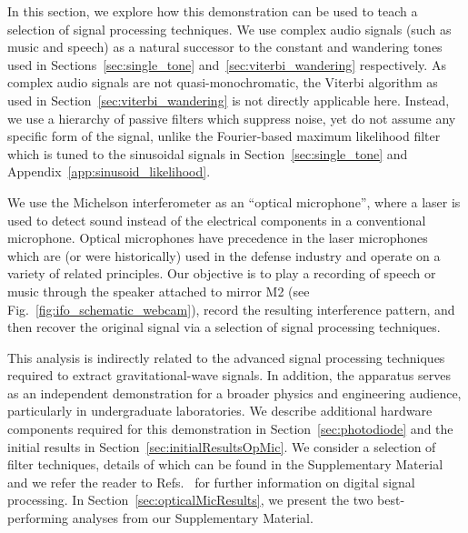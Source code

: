 \documentclass[paper-main.tex]{subfiles}
\begin{document}
In this section, we explore how this demonstration can be used to teach a selection of signal processing techniques. 
We use complex audio signals (such as music and speech) as a natural successor to the constant and wandering tones used in Sections~\ref{sec:single_tone} and~\ref{sec:viterbi_wandering} respectively.
As complex audio signals are not quasi-monochromatic, the Viterbi algorithm as used in Section~\ref{sec:viterbi_wandering} is not directly applicable here. 
Instead, we use a hierarchy of passive filters which suppress noise, yet do not assume any specific form of the signal, unlike the Fourier-based maximum likelihood filter which is tuned to the sinusoidal signals in Section~\ref{sec:single_tone} and Appendix~\ref{app:sinusoid_likelihood}.

We use the Michelson interferometer as an ``optical microphone'', where a laser is used to detect sound instead of the electrical components in a conventional microphone.
Optical microphones have precedence in the laser microphones~\cite{laser_microphone} which are (or were historically) used in the defense industry and operate on a variety of related principles. 
Our objective is to play a recording of speech or music through the speaker attached to mirror M2 (see Fig.~\ref{fig:ifo_schematic_webcam}), record the resulting interference pattern, and then recover the original signal via a selection of signal processing techniques. 


This analysis is indirectly related to the advanced signal processing techniques required to extract gravitational-wave signals. 
In addition, the apparatus serves as an independent demonstration for a broader physics and engineering audience, particularly in undergraduate laboratories. 
We describe additional hardware components required for this demonstration in Section~\ref{sec:photodiode} and the initial results in Section~\ref{sec:initialResultsOpMic}. 
We consider a selection of filter techniques, details of which can be found in the Supplementary Material and we refer the reader to Refs.~\cite{Mitra:2011, Lyons:2011, Stein:2000, OpenheimSchaferBuck:1999, PrakisManolakis:1996,10.5555/151045, DigitalProcingOfSpeechSignals:1978} for further information on digital signal processing. 
In Section~\ref{sec:opticalMicResults}, we present the two best-performing analyses from our Supplementary Material. 
\end{document}
